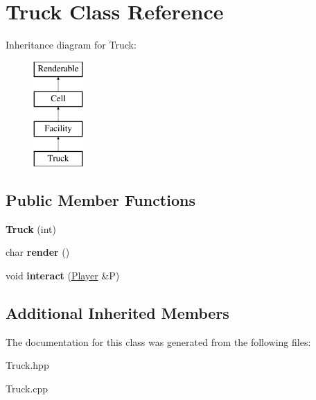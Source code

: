 \hypertarget{class_truck}{}\section{Truck Class Reference}
\label{class_truck}
Inheritance diagram for Truck\+:\begin{figure}[H]
\begin{center}
\leavevmode
\includegraphics[height=4.000000cm]{class_truck}
\end{center}
\end{figure}
\subsection*{Public Member Functions}
\begin{DoxyCompactItemize}
\item 
\mbox{\label{class_truck_a43dc6b68b428af2f257f5584c85a95e5}} 
{\bfseries Truck} (int)
\item 
\mbox{\label{class_truck_a47dc2b7e201b85933aea7da631df7f1b}} 
char {\bfseries render} ()
\item 
\mbox{\label{class_truck_a03e1f131eaac6fea1306a2fa0e4707ae}} 
void {\bfseries interact} (\mbox{\hyperlink{class_player}{Player}} \&P)
\end{DoxyCompactItemize}
\subsection*{Additional Inherited Members}


The documentation for this class was generated from the following files\+:\begin{DoxyCompactItemize}
\item 
Truck.\+hpp\item 
Truck.\+cpp\end{DoxyCompactItemize}

